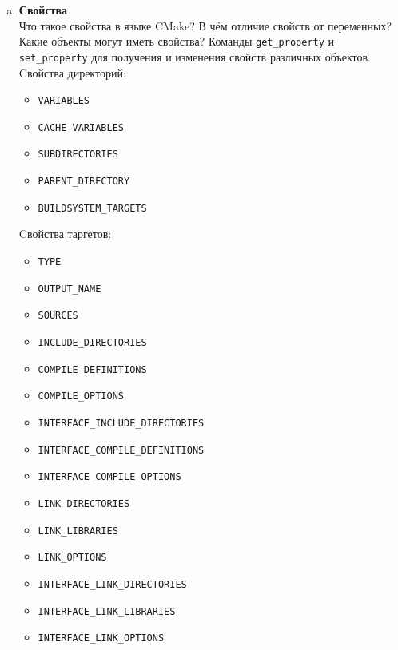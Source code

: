 \documentclass{article}
\begin{document}
\begin{enumerate}
\begin{enumerate}[a.]
\item \textbf{Свойства}\\
Что такое свойства в языке CMake? В чём отличие свойств от переменных? Какие объекты могут иметь свойства?
Команды \texttt{get\_property} и \texttt{set\_property} для получения и изменения свойств различных объектов.
Cвойства директорий:
\begin{itemize}
\item \texttt{VARIABLES}
\item \texttt{CACHE\_VARIABLES}
\item \texttt{SUBDIRECTORIES}
\item \texttt{PARENT\_DIRECTORY}
\item \texttt{BUILDSYSTEM\_TARGETS}
\end{itemize}

Cвойства таргетов:
\begin{multicols}{2}
\begin{itemize}
\item \texttt{TYPE}
\item \texttt{OUTPUT\_NAME}
\item \texttt{SOURCES}
\item \texttt{INCLUDE\_DIRECTORIES}
\item \texttt{COMPILE\_DEFINITIONS}
\item \texttt{COMPILE\_OPTIONS}
\item \texttt{INTERFACE\_INCLUDE\_DIRECTORIES}
\item \texttt{INTERFACE\_COMPILE\_DEFINITIONS}
\item \texttt{INTERFACE\_COMPILE\_OPTIONS}
\item \texttt{LINK\_DIRECTORIES}
\item \texttt{LINK\_LIBRARIES}
\item \texttt{LINK\_OPTIONS}
\item \texttt{INTERFACE\_LINK\_DIRECTORIES}
\item \texttt{INTERFACE\_LINK\_LIBRARIES}
\item \texttt{INTERFACE\_LINK\_OPTIONS}
\end{itemize}
\end{multicols}


\end{enumerate}
\end{enumerate}
\end{document}
